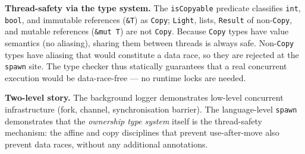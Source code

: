 \noindent
\textbf{Thread-safety via the type system.}
The \texttt{isCopyable} predicate classifies \texttt{int}, \texttt{bool}, and
immutable references (\texttt{\&T}) as \texttt{Copy}; \texttt{Light}, lists,
\texttt{Result} of non-\texttt{Copy}, and mutable references
(\texttt{\&mut T}) are not \texttt{Copy}.
Because \texttt{Copy} types have value semantics (no aliasing), sharing them
between threads is always safe.
Non-\texttt{Copy} types have aliasing that would constitute a data race, so
they are rejected at the \texttt{spawn} site.
The type checker thus statically guarantees that a real concurrent execution
would be data-race-free --- no runtime locks are needed.

\noindent
\textbf{Two-level story.}
The background logger demonstrates low-level concurrent infrastructure
(fork, channel, synchronisation barrier).
The language-level \texttt{spawn} demonstrates that the \emph{ownership type
system} itself is the thread-safety mechanism: the affine and copy disciplines
that prevent use-after-move also prevent data races, without any additional
annotations.
